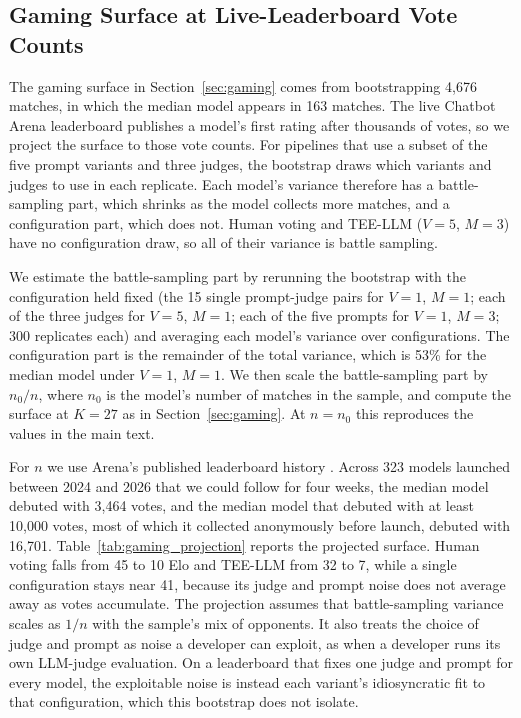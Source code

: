 \subsection{Gaming Surface at Live-Leaderboard Vote Counts}\label{si:gaming_projection}

The gaming surface in Section~\ref{sec:gaming} comes from bootstrapping 4,676 matches, in which the median model appears in 163 matches. The live Chatbot Arena leaderboard publishes a model's first rating after thousands of votes, so we project the surface to those vote counts. For pipelines that use a subset of the five prompt variants and three judges, the bootstrap draws which variants and judges to use in each replicate. Each model's variance therefore has a battle-sampling part, which shrinks as the model collects more matches, and a configuration part, which does not. Human voting and TEE-LLM ($V{=}5$, $M{=}3$) have no configuration draw, so all of their variance is battle sampling.

We estimate the battle-sampling part by rerunning the bootstrap with the configuration held fixed (the 15 single prompt-judge pairs for $V{=}1$, $M{=}1$; each of the three judges for $V{=}5$, $M{=}1$; each of the five prompts for $V{=}1$, $M{=}3$; 300 replicates each) and averaging each model's variance over configurations. The configuration part is the remainder of the total variance, which is 53\% for the median model under $V{=}1$, $M{=}1$. We then scale the battle-sampling part by $n_0/n$, where $n_0$ is the model's number of matches in the sample, and compute the surface at $K{=}27$ as in Section~\ref{sec:gaming}. At $n = n_0$ this reproduces the values in the main text.

For $n$ we use Arena's published leaderboard history \citep{arena2026leaderboarddata}. Across 323 models launched between 2024 and 2026 that we could follow for four weeks, the median model debuted with 3,464 votes, and the median model that debuted with at least 10,000 votes, most of which it collected anonymously before launch, debuted with 16,701. Table~\ref{tab:gaming_projection} reports the projected surface. Human voting falls from 45 to 10 Elo and TEE-LLM from 32 to 7, while a single configuration stays near 41, because its judge and prompt noise does not average away as votes accumulate. The projection assumes that battle-sampling variance scales as $1/n$ with the sample's mix of opponents. It also treats the choice of judge and prompt as noise a developer can exploit, as when a developer runs its own LLM-judge evaluation. On a leaderboard that fixes one judge and prompt for every model, the exploitable noise is instead each variant's idiosyncratic fit to that configuration, which this bootstrap does not isolate.

